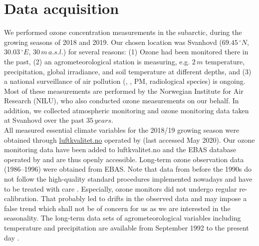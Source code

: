 \documentclass[bg, manuscript]{copernicus}
\begin{document}
\section{Data acquisition}
\label{sec:data}

We performed ozone concentration measurements in the subarctic, during the growing seasons of 2018 and 2019. Our chosen location was Svanhovd ($69.45\,\unit{^\circ N}$, $30.03\,\unit{^\circ E}$, $30\,\unit{m\,a.s.l.}$) for several reasons: (1) Ozone had been monitored there in the past, (2) an agrometeorological station is measuring, e.g. $2\,\unit{m}$ temperature, precipitation, global irradiance, and soil temperature at different depths, and (3) a national surveillance of air pollution (, , PM, radiological species) is ongoing. Most of these measurements are performed by the Norwegian Institute for Air Research (NILU), who also conducted ozone measurements on our behalf. In addition, we collected atmospheric monitoring and ozone monitoring data taken at Svanhovd over the past $35\,\unit{years}$.\\

All measured essential climate variables for the 2018/19 growing season were obtained through \href{luftkvalitet.no}{luftkvalitet.no} operated by \citet{NILU_AIRQ} (last accessed May 2020). Our ozone monitoring data have been added to luftkvalitet.no and the EBAS database operated by \citet{NILU_EBAS} and are thus openly accessible. Long-term ozone observation data (1986--1996) were obtained from EBAS. Note that data from before the 1990s do not follow the high-quality standard procedures implemented nowadays and have to be treated with care \citep{NILU2003}. Especially, ozone monitors did not undergo regular re-calibration. That probably led to drifts in the observed data and may impose a false trend which shall not be of concern for us as we are interested in the seasonality.
The long-term data sets of agrometeorological variables including temperature and precipitation are available from September 1992 to the present day \citep[LandbruksMeteorologiske Tjeneste][note the station name here is Pasvik]{LMT_NIBIO}.
\end{document}

